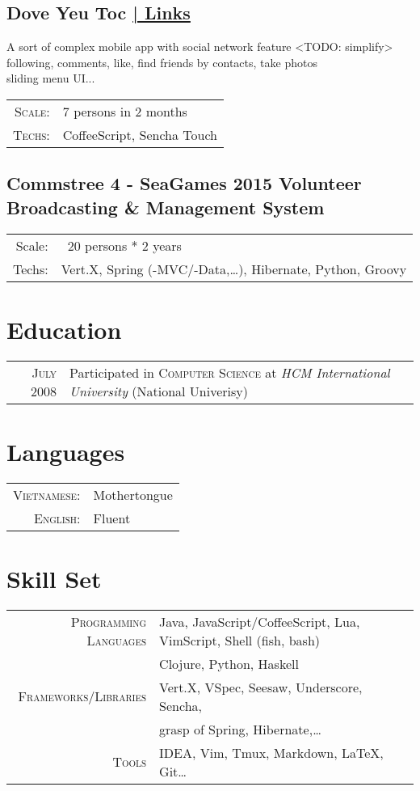 \documentclass[a4paper,10pt]{article}
\begin{document}
\subsection*{Dove Yeu Toc \hfill \hyperlink{dove-links} { | \footnotesize Links}}

A sort of complex mobile app with social network feature <TODO: simplify> following, comments, like, find friends by contacts, take photos\\
sliding menu UI...

\begin{tabular}{rl}
    \textsc{Scale:} & 7 persons in 2 months\\
    \textsc{Techs:} & CoffeeScript, Sencha Touch\\
\end{tabular}

\subsection*{Commstree 4 - SeaGames 2015 Volunteer Broadcasting \& Management System}
\begin{tabular}{rl}
    Scale: & ~20 persons * 2 years\\
    Techs: & Vert.X, Spring (-MVC/-Data,\ldots), Hibernate, Python, Groovy
\end{tabular}


\section{Education}
\begin{tabular}{rl}	
    \textsc{July} 2008 & Participated in \textsc{Computer Science} at \textit{HCM International University} (National Univerisy)
\end{tabular}

\section{Languages}
\begin{tabular}{rl}
 \textsc{Vietnamese:}&Mothertongue\\
\textsc{English:}&Fluent\\
\end{tabular}

\section{Skill Set}
\begin{tabular}{rl}
    \textsc{Programming Languages} & Java, JavaScript/CoffeeScript, Lua, VimScript, Shell (fish, bash)\\
                                   & Clojure, Python, Haskell\\
    \textsc{Frameworks/Libraries} & Vert.X, VSpec, Seesaw, Underscore, Sencha,\\
                                  & grasp of Spring, Hibernate,\ldots\\
    \textsc{Tools} & IDEA, Vim, Tmux, Markdown, \LaTeX, Git\ldots\\
\end{tabular}
\end{document}
